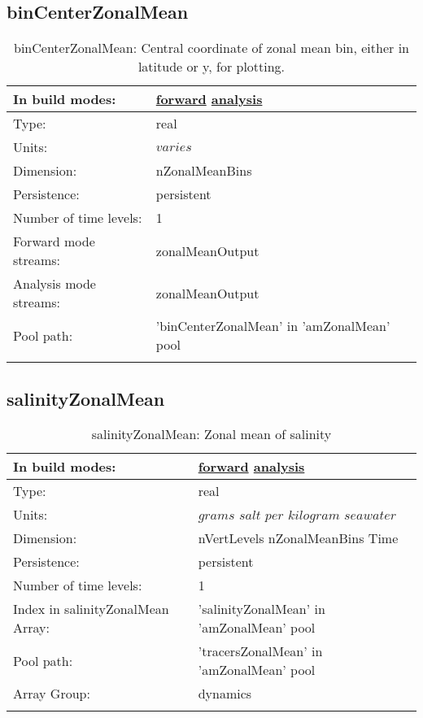 \subsection[binCenterZonalMean]{binCenterZonalMean}
\label{subsec:var_sec_amZonalMean_binCenterZonalMean}
\begin{center}
\begin{longtable}{| p{2.0in} | p{4.0in} |}
        \hline 
        In build modes: & \hyperref[subsec:forward_var_tab_amZonalMean]{forward} \hyperref[subsec:analysis_var_tab_amZonalMean]{analysis} \\
        \hline 
        Type: & real \\
        \hline 
        Units: & $varies$ \\
        \hline 
        Dimension: & nZonalMeanBins \\
        \hline 
        Persistence: & persistent \\
        \hline 
        Number of time levels: & 1 \\
        \hline 
		 Forward mode streams: &  zonalMeanOutput \\
        \hline 
		 Analysis mode streams: &  zonalMeanOutput \\
        \hline 
            Pool path: & 'binCenterZonalMean' in 'amZonalMean' pool
 \\
		 \hline 
    \caption{binCenterZonalMean: Central coordinate of zonal mean bin, either in latitude or y, for plotting.}
\end{longtable}
\end{center}
\subsection[salinityZonalMean]{salinityZonalMean}
\label{subsec:var_sec_amZonalMean_salinityZonalMean}
\begin{center}
\begin{longtable}{| p{2.0in} | p{4.0in} |}
        \hline 
        In build modes: & \hyperref[subsec:forward_var_tab_amZonalMean]{forward} \hyperref[subsec:analysis_var_tab_amZonalMean]{analysis} \\
        \hline 
        Type: & real \\
        \hline 
        Units: & $grams$ $salt$ $per$ $kilogram$ $seawater$ \\
        \hline 
        Dimension: & nVertLevels nZonalMeanBins Time \\
        \hline 
        Persistence: & persistent \\
        \hline 
        Number of time levels: & 1 \\
        \hline 
		 Index in salinityZonalMean Array: & 'salinityZonalMean' in 'amZonalMean' pool \\
		 \hline 
            Pool path: & 'tracersZonalMean' in 'amZonalMean' pool
 \\
		 \hline 
		 Array Group: & dynamics \\
		 \hline 
    \caption{salinityZonalMean: Zonal mean of salinity}
\end{longtable}
\end{center}
